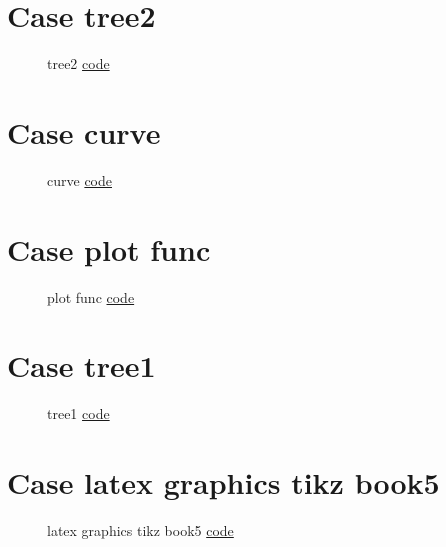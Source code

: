\documentclass{article}
\begin{document}
\section{Case tree2}

\begin{figure}[H]
	\centering
	
	\caption{tree2 \href{https:/github.com/cauliyang/learn_tikz/blob/main/source/tree2.tex}{code} }
	\label{fig:tree2}
\end{figure}

\section{Case curve}

\begin{figure}[H]
	\centering
	
	\caption{curve \href{https:/github.com/cauliyang/learn_tikz/blob/main/source/curve.tex}{code} }
	\label{fig:curve}
\end{figure}

\section{Case plot func}

\begin{figure}[H]
	\centering
	
	\caption{plot func \href{https:/github.com/cauliyang/learn_tikz/blob/main/source/plot_func.tex}{code} }
	\label{fig:plot func}
\end{figure}

\section{Case tree1}

\begin{figure}[H]
	\centering
	
	\caption{tree1 \href{https:/github.com/cauliyang/learn_tikz/blob/main/source/tree1.tex}{code} }
	\label{fig:tree1}
\end{figure}

\section{Case latex graphics tikz book5}

\begin{figure}[H]
	\centering
	
	\caption{latex graphics tikz book5 \href{https:/github.com/cauliyang/learn_tikz/blob/main/source/latex_graphics_tikz_book5.tex}{code} }
	\label{fig:latex graphics tikz book5}
\end{figure}
\end{document}
